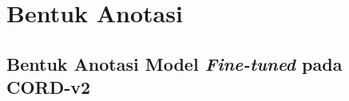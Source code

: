 \chapter{Bentuk Anotasi}
\label{chap:bentuk-anotasi}

\section{Bentuk Anotasi Model \donut{} \emph{Fine-tuned} pada \datasetfl{} CORD-v2}

